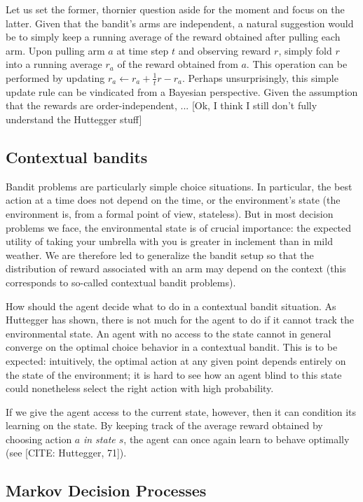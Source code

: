 \documentclass{article}
\begin{document}
Let us set the former, thornier question aside for the moment and focus on the latter.
Given that the bandit's arms are independent, a natural suggestion would be to simply keep a running average of the reward obtained after pulling each arm.
Upon pulling arm $a$ at time step $t$ and observing reward $r$, simply fold $r$ into a running average $r_a$ of the reward obtained from $a$.
This operation can be performed by updating $r_a \leftarrow r_a + \frac{1}{t}{r - r_a}$.
Perhaps unsurprisingly, this simple update rule can be vindicated from a Bayesian perspective.
Given the assumption that the rewards are order-independent, ...
[Ok, I think I still don't fully understand the Huttegger stuff]

\subsection{Contextual bandits}

Bandit problems are particularly simple choice situations.
In particular, the best action at a time does not depend on the time, or the environment's state (the environment is, from a formal point of view, stateless).
But in most decision problems we face, the environmental state is of crucial importance: the expected utility of taking your umbrella with you is greater in inclement than in mild weather.
We are therefore led to generalize the bandit setup so that the distribution of reward associated with an arm may depend on the context (this corresponds to so-called contextual bandit problems).

How should the agent decide what to do in a contextual bandit situation.
As Huttegger has shown, there is not much for the agent to do if it cannot track the environmental state.
An agent with no access to the state cannot in general converge on the optimal choice behavior in a contextual bandit.
This is to be expected: intuitively, the optimal action at any given point depends entirely on the state of the environment; it is hard to see how an agent blind to this state could nonetheless select the right action with high probability.

If we give the agent access to the current state, however, then it can condition its learning on the state.
By keeping track of the average reward obtained by choosing action $a$ \emph{in state $s$}, the agent can once again learn to behave optimally (see [CITE: 
Huttegger, 71]).

\subsection{Markov Decision Processes}
\end{document}
